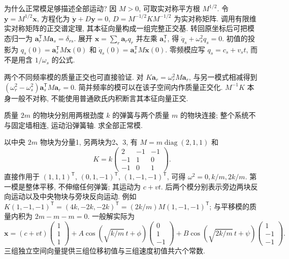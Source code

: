 为什么正常模足够描述全部运动? 因 $M>0$, 可取实对称平方根 $M^{1/2}$. 令 $\boldsymbol y=M^{1/2}\boldsymbol x$, 方程化为 $\ddot{\boldsymbol y}+D\boldsymbol y=0$, $D=M^{-1/2}KM^{-1/2}$ 为实对称矩阵. 调用有限维实对称矩阵的正交谱定理, 其本征向量构成一组完整正交基. 转回原坐标后可把模态归一为 $\boldsymbol a_r^{\mathsf T}M\boldsymbol a_s=\delta_{rs}$. 展开 $\boldsymbol x=\sum_r\boldsymbol a_r q_r$ 并左乘 $\boldsymbol a_s^{\mathsf T}$, 得 $\ddot q_s+\omega_s^2q_s=0$. 初值的投影为 $q_s(0)=\boldsymbol a_s^{\mathsf T}M\boldsymbol x(0)$ 和 $\dot q_s(0)=\boldsymbol a_s^{\mathsf T}M\dot{\boldsymbol x}(0)$. 零频模应写 $q_s=c_s+v_st$, 而不是用含 $1/\omega_s$ 的公式.

两个不同频率模的质量正交也可直接验证. 对 $K\boldsymbol a_r=\omega_r^2M\boldsymbol a_r$, 与另一模式相减得到 $(\omega_r^2-\omega_s^2)\boldsymbol a_s^{\mathsf T}M\boldsymbol a_r=0$. 简并频率的模可以在该子空间内作质量正交化. $M^{-1}K$ 本身一般不对称, 不能使用普通欧氏内积断言其本征向量正交.

\begin{example}
质量 $2m$ 的物块分别用两根劲度 $k$ 的弹簧与两个质量 $m$ 的物块连接; 整个系统不与固定墙相连, 运动沿弹簧轴. 求全部正常模.
\end{example}
\begin{solution}
以中央 $2m$ 物块为分量1, 另两块为2、3, 有 $M=m\operatorname{diag}(2,1,1)$ 和
\[
K=k\begin{pmatrix}2&-1&-1\\-1&1&0\\-1&0&1\end{pmatrix}.
\]
直接作用于 $(1,1,1)^{\mathsf T}$, $(0,1,-1)^{\mathsf T}$, $(1,-1,-1)^{\mathsf T}$, 可得 $\omega^2=0,k/m,2k/m$. 第一模是整体平移, 不伸缩任何弹簧; 其运动为 $c+vt$. 后两个模分别表示旁边两块反向运动以及中央物块与旁块反向运动. 例如 $K(1,-1,-1)^{\mathsf T}=(4k,-2k,-2k)^{\mathsf T}=(2k/m)M(1,-1,-1)^{\mathsf T}$; 与平移模的质量内积为 $2m-m-m=0$. 一般解实际为
\[
\boldsymbol x=(c+vt)\begin{pmatrix}1\\1\\1\end{pmatrix}
+A\cos(\sqrt{k/m}\,t+\phi)\begin{pmatrix}0\\1\\-1\end{pmatrix}
+B\cos(\sqrt{2k/m}\,t+\psi)\begin{pmatrix}1\\-1\\-1\end{pmatrix}.
\]
三组独立空间向量提供三组位移初值与三组速度初值共六个常数.
\end{solution}

